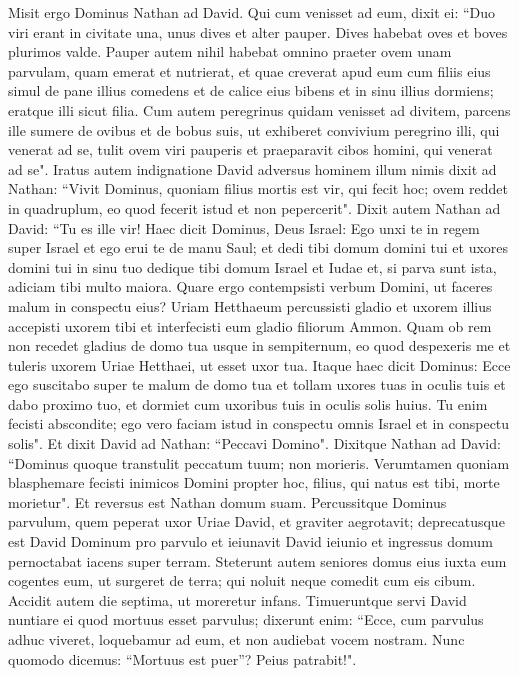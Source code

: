 \begin{biblechapter}  
\verse Misit ergo Dominus Nathan ad David. Qui cum venisset ad eum, dixit ei: “Duo viri erant in civitate una, unus dives et alter pauper. 
\verse Dives habebat oves et boves plurimos valde. 
\verse Pauper autem nihil habebat omnino praeter ovem unam parvulam, quam emerat et nutrierat, et quae creverat apud eum cum filiis eius simul de pane illius comedens et de calice eius bibens et in sinu illius dormiens; eratque illi sicut filia. 
\verse Cum autem peregrinus quidam venisset ad divitem, parcens ille sumere de ovibus et de bobus suis, ut exhiberet convivium peregrino illi, qui venerat ad se, tulit ovem viri pauperis et praeparavit cibos homini, qui venerat ad se". 
\verse Iratus autem indignatione David adversus hominem illum nimis dixit ad Nathan: “Vivit Dominus, quoniam filius mortis est vir, qui fecit hoc; 
\verse ovem reddet in quadruplum, eo quod fecerit istud et non pepercerit". 
\verse Dixit autem Nathan ad David: “Tu es ille vir! Haec dicit Dominus, Deus Israel: Ego unxi te in regem super Israel et ego erui te de manu Saul; 
\verse et dedi tibi domum domini tui et uxores domini tui in sinu tuo dedique tibi domum Israel et Iudae et, si parva sunt ista, adiciam tibi multo maiora. 
\verse Quare ergo contempsisti verbum Domini, ut faceres malum in conspectu eius? Uriam Hetthaeum percussisti gladio et uxorem illius accepisti uxorem tibi et interfecisti eum gladio filiorum Ammon. 
\verse Quam ob rem non recedet gladius de domo tua usque in sempiternum, eo quod despexeris me et tuleris uxorem Uriae Hetthaei, ut esset uxor tua. 
\verse Itaque haec dicit Dominus: Ecce ego suscitabo super te malum de domo tua et tollam uxores tuas in oculis tuis et dabo proximo tuo, et dormiet cum uxoribus tuis in oculis solis huius. 
\verse Tu enim fecisti abscondite; ego vero faciam istud in conspectu omnis Israel et in conspectu solis". 
\verse Et dixit David ad Nathan: “Peccavi Domino". Dixitque Nathan ad David: “Dominus quoque transtulit peccatum tuum; non morieris. 
\verse Verumtamen quoniam blasphemare fecisti inimicos Domini propter hoc, filius, qui natus est tibi, morte morietur". 
\verse Et reversus est Nathan domum suam. Percussitque Dominus parvulum, quem peperat uxor Uriae David, et graviter aegrotavit; 
\verse deprecatusque est David Dominum pro parvulo et ieiunavit David ieiunio et ingressus domum pernoctabat iacens super terram. 
\verse Steterunt autem seniores domus eius iuxta eum cogentes eum, ut surgeret de terra; qui noluit neque comedit cum eis cibum. 
\verse Accidit autem die septima, ut moreretur infans. Timueruntque servi David nuntiare ei quod mortuus esset parvulus; dixerunt enim: “Ecce, cum parvulus adhuc viveret, loquebamur ad eum, et non audiebat vocem nostram. Nunc quomodo dicemus: “Mortuus est puer”? Peius patrabit!". 

\end{biblechapter}
